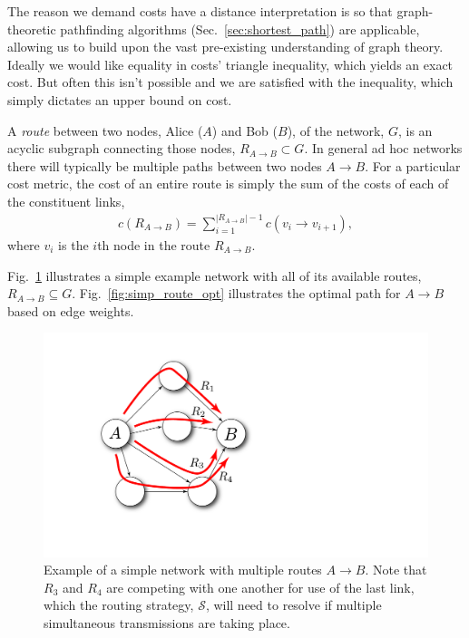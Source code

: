 \documentclass[aps,rmp,twocolumn,amsmath,amssymb,nofootinbib,superscriptaddress]{revtex4}
\begin{document}
The reason we demand costs have a distance interpretation is so that graph-theoretic pathfinding algorithms (Sec.~\ref{sec:shortest_path}) are applicable, allowing us to build upon the vast pre-existing understanding of graph theory. Ideally we would like equality in costs' triangle inequality, which yields an exact cost. But often this isn't possible and we are satisfied with the inequality, which simply dictates an upper bound on cost.

A \emph{route} between two nodes, Alice ($A$) and Bob ($B$), of the network, $G$, is an acyclic subgraph connecting those nodes, \mbox{$R_{A\to B}\subset G$}. In general ad hoc networks there will typically be multiple paths between two nodes \mbox{$A\to B$}. For a particular cost metric, the cost of an entire route is simply the sum of the costs of each of the constituent links,
\begin{align}
c(R_{A\to B}) = \sum_{i=1}^{|R_{A\to B}|-1} c(v_i \to v_{i+1}),
\end{align}
where $v_i$ is the $i$th node in the route $R_{A\to B}$.

Fig.~\ref{fig:example_routes} illustrates a simple example network with all of its available routes, \mbox{$R_{A\to B} \subseteq G$}. Fig.~\ref{fig:simp_route_opt} illustrates the optimal path for \mbox{$A\to B$} based on edge weights.

\begin{figure}[!htb]
\includegraphics[width=0.65\columnwidth]{example_routes}
\caption{Example of a simple network with multiple routes \mbox{$A\to B$}. Note that $R_3$ and $R_4$ are competing with one another for use of the last link, which the routing strategy, $\mathcal{S}$, will need to resolve if multiple simultaneous transmissions are taking place.} \label{fig:example_routes}
\end{figure}
\end{document}
